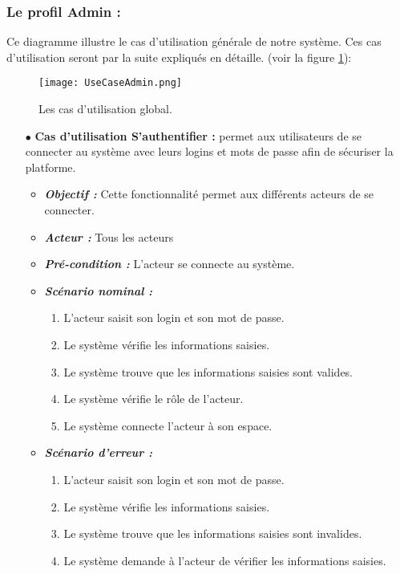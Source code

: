 \subsubsection{Le profil Admin :}
Ce diagramme illustre le cas d’utilisation générale de notre système. Ces cas d’utilisation seront par la suite expliqués en détaille. (voir la figure \ref{fig:UseCaseAdmin}):
\begin{figure}[ht]
  \centering
  \texttt{[image: UseCaseAdmin.png]}
  \caption{Les cas d'utilisation global.}
  \label{fig:UseCaseAdmin}
\end{figure}
\FloatBarrier
\begin{itemize}

\item[$\bullet$] \textbf{Cas d’utilisation S’authentifier :} permet aux utilisateurs de se connecter au système avec leurs logins et mots de passe afin de sécuriser la platforme.
\medskip
    \begin{itemize}
    \item \textit{\textbf{Objectif :}}  Cette fonctionnalité permet aux différents acteurs de se connecter. 

    \item \textit{\textbf{Acteur :}} Tous les acteurs

    \item \textit{\textbf{Pré-condition  :}} L’acteur se connecte au système.

    \item \textit{\textbf{Scénario nominal :}}
         \begin{enumerate}
             \item L’acteur saisit son login et son mot de passe. 
             \item Le système vérifie les informations saisies. 
             \item Le système trouve que les informations saisies sont valides.  
             \item Le système vérifie le rôle de l’acteur.  
             \item Le système connecte l’acteur à son espace.
         \end{enumerate}
    \item \textit{\textbf{Scénario d'erreur :}} 
         \begin{enumerate}
             \item L’acteur saisit son login et son mot de passe. 
             \item Le système vérifie les informations saisies.   
             \item Le système trouve que les informations saisies sont invalides.  
             \item Le système demande à l’acteur de vérifier les informations saisies.
         \end{enumerate}
    \end{itemize}


\end{itemize}
